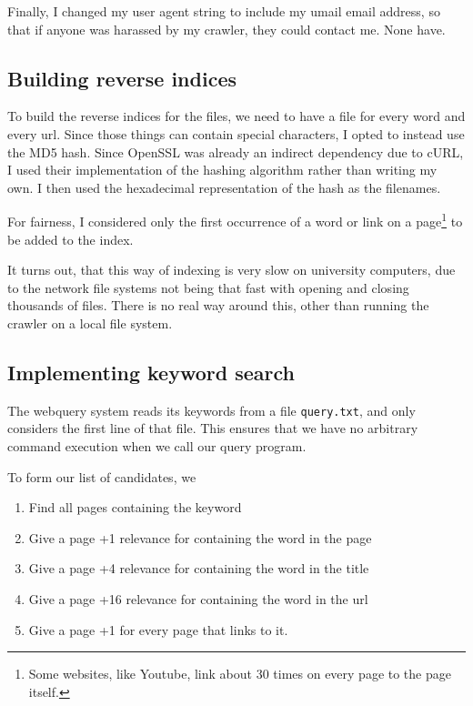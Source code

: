 \documentclass[12pt,a4paper]{article}
\begin{document}
Finally, I changed my user agent string to include my umail email address, so that if anyone was harassed by my crawler, they could contact me. None have.

\subsection{Building reverse indices}

To build the reverse indices for the files, we need to have a file for every word and every url. Since those things can contain special characters, I opted to instead use the MD5 hash. Since OpenSSL was already an indirect dependency due to cURL, I used their implementation of the hashing algorithm rather than writing my own. I then used the hexadecimal representation of the hash as the filenames.

For fairness, I considered only the first occurrence of a word or link on a page\footnote{Some websites, like Youtube, link about 30 times on every page to the page itself.} to be added to the index.

It turns out, that this way of indexing is very slow on university computers, due to the network file systems not being that fast with opening and closing thousands of files. There is no real way around this, other than running the crawler on a local file system.

\subsection{Implementing keyword search}

The webquery system reads its keywords from a file \texttt{query.txt}, and only considers the first line of that file. This ensures that we have no arbitrary command execution when we call our query program.

To form our list of candidates, we

\begin{enumerate}
	\item Find all pages containing the keyword
	\item Give a page +1 relevance for containing the word in the page
	\item Give a page +4 relevance for containing the word in the title
	\item Give a page +16 relevance for containing the word in the url
	\item Give a page +1 for every page that links to it.
\end{enumerate}
\end{document}
